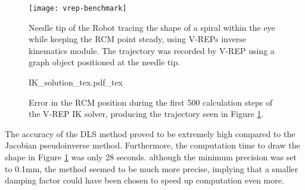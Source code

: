 \begin{figure}[h!]
	\begin{center}
		\texttt{[image: vrep-benchmark]}
		\caption{Needle tip of the Robot tracing the shape of a spiral within the eye while keeping the RCM point steady, using V-REPs inverse kinematics module. The trajectory was recorded by V-REP using a graph object positioned at the needle tip. }
		\label{DLS_method}
	\end{center}
\end{figure}

\begin{figure}[h!]
	\begin{center}
		{IK_solution_tex.pdf_tex}
		\caption{Error in the RCM position during the first 500 calculation steps of the V-REP IK solver, producing the trajectory seen in Figure \ref{DLS_method}.}
		\label{DLS_result}
	\end{center}
\end{figure}

The accuracy of the DLS method proved to be extremely high compared to the Jacobian pseudoinverse method. Furthermore, the computation time to draw the shape in Figure \ref{DLS_method} was only 28 seconds. although the minimum precision was set to 0.1mm, the method seemed to be much more precise, implying that a smaller damping factor could have been chosen to speed up computation even more. 
